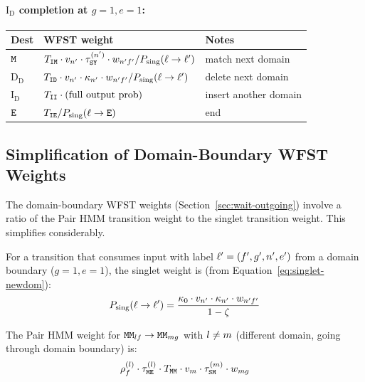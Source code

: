 \paragraph{$\mathrm{I_D}$ completion at $g=1, e=1$:}
\begin{center}
\renewcommand{\arraystretch}{1.3}
\begin{tabular}{lll}
\hline
Dest & WFST weight & Notes \\
\hline
${\tt M}$ &
  $T_{{\tt I}{\tt M}} \cdot v_{n'} \cdot
   \tau^{(n')}_{{\tt S}{\tt Y}} \cdot w_{n'f'}
   / P_{\rm sing}(\ell \to \ell')$ &
  match next domain \\
$\mathrm{D_D}$ &
  $T_{{\tt I}{\tt D}} \cdot v_{n'} \cdot
   \kappa_{n'} \cdot w_{n'f'}
   / P_{\rm sing}(\ell \to \ell')$ &
  delete next domain \\
$\mathrm{I_D}$ &
  $T_{{\tt I}{\tt I}} \cdot (\text{full output prob})$ &
  insert another domain \\
${\tt E}$ & $T_{{\tt I}{\tt E}} / P_{\rm sing}(\ell \to {\tt E})$ &
  end \\
\hline
\end{tabular}
\end{center}


\subsection{Simplification of Domain-Boundary WFST Weights}
\label{sec:wfst-simplify}
\label{sec:simplification}

The domain-boundary WFST weights (Section~\ref{sec:wait-outgoing}) involve
a ratio of the Pair HMM transition weight to the singlet transition weight.
This simplifies considerably.

For a transition that consumes input with label $\ell' = (f', g', n', e')$
from a domain boundary ($g=1, e=1$), the singlet weight is
(from Equation~\ref{eq:singlet-newdom}):
\[
P_{\rm sing}(\ell \to \ell') = \frac{\kappa_0 \cdot v_{n'} \cdot \kappa_{n'} \cdot w_{n'f'}}{1 - \zeta}
\]

The Pair HMM weight for ${\tt M}{\tt M}_{lf} \to {\tt M}{\tt M}_{mg}$
with $l \neq m$ (different domain, going through domain boundary) is:
\[
\rho^{(l)}_f \cdot \tau^{(l)}_{{\tt M}{\tt E}} \cdot
T_{{\tt M}{\tt M}} \cdot v_{m} \cdot
\tau^{(m)}_{{\tt S}{\tt M}} \cdot w_{mg}
\]


